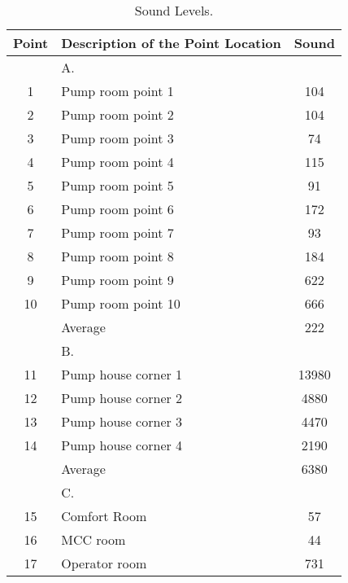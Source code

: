 \begin{table}
	\caption{Sound Levels.}
	\label{ch047_tbl_sound}
	{\footnotesize

\begin{tabular}{c|l|c}

\hline
Point & Description of the Point Location & Sound \\ 
\hline
 & A. &  \\ 
1 & Pump room point 1 & 104 \\ 
2 & Pump room point 2 & 104 \\ 
3 & Pump room point 3 & 74 \\ 
4 & Pump room point 4 & 115 \\ 
5 & Pump room point 5 & 91 \\ 
6 & Pump room point 6 & 172 \\ 
7 & Pump room point 7 & 93 \\ 
8 & Pump room point 8 & 184 \\ 
9 & Pump room point 9 & 622 \\ 
10 & Pump room point 10 & 666 \\ 
 & Average & 222 \\ 
\hline
 & B. &  \\ 
11 & Pump house corner 1 & 13980 \\ 
12 & Pump house corner 2 & 4880 \\ 
13 & Pump house corner 3 & 4470 \\ 
14 & Pump house corner 4 & 2190 \\ 
 & Average & 6380 \\ 
\hline
 & C. &  \\ 
15 & Comfort Room & 57 \\ 
16 & MCC room & 44 \\ 
17 & Operator room & 731 \\ 
\hline

\end{tabular}
}
\end{table}